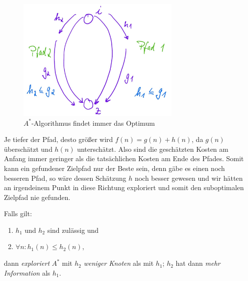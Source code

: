 \documentclass[runningheads,deutsch]{llncs}
\begin{document}
\begin{figure}
    \begin{center}
        \includegraphics[width=8cm]{a_stern_argument_grafik.jpg}
    \end{center}
    \caption{$A^*$-Algorithmus findet immer das Optimum}    
\end{figure}

Je tiefer der Pfad, desto größer wird $f(n) = g(n) + h(n)$, da $g(n)$ überschätzt und $h(n)$ unterschätzt. Also sind die geschätzten Kosten am Anfang immer geringer als die tatsächlichen Kosten am Ende des Pfades. Somit kann ein gefundener Zielpfad nur der Beste sein, denn gäbe es einen noch besseren Pfad, so wäre dessen Schätzung $h$ noch besser gewesen und wir hätten an irgendeinem Punkt in diese Richtung exploriert und somit den suboptimalen Zielpfad nie gefunden.

Falls gilt:
\begin{enumerate}
    \item $h_1$ und $h_2$ sind zulässig und
    \item $\forall n: h_1(n) \leq h_2(n)$,
\end{enumerate}

dann \textit{exploriert} $A^*$ mit $h_2$ \textit{weniger Knoten} als mit $h_1$; $h_2$ hat dann \textit{mehr Information} als $h_1$.
\end{document}
